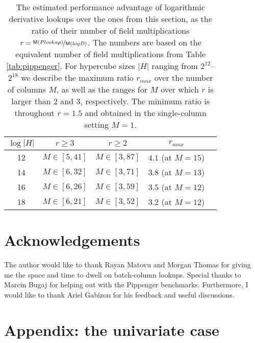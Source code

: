 \documentclass[11pt]{article}
\theoremstyle{definition}
\theoremstyle{definition}
\begin{document}
\begin{table}[h!]
\caption{%
The estimated performance advantage of logarithmic derivative lookups over the ones from this section, as the ratio of their number of field multiplications $r =\nicefrac{\mathsf M({Plookup})}{\mathsf M({logD})}$.
The numbers are based on the equivalent number of field multiplications from Table \ref{tab:pippenger}.
For hypercube sizes $|H|$ ranging from $2^{12}$--$2^{18}$ we describe the maximum ratio $r_{max}$ over the number of columns $M$, as well as the ranges for $M$ over which $r$ is larger than $2$ and $3$, respectively.
The minimum ratio is throughout $r= 1.5$ and obtained in the single-column setting $M=1$. 
}
\label{tab:comparison}
\vspace*{0.5cm}
\centering
\begin{tabular} {|c|c|c|c|c|}
\hline
$\log|H|$ & $r\geq 3$ & $r\geq 2$ & $r_{max}$ 
\\\hline
12 & $M\in [5, 41]$ & $M\in [3, 87]$ & $4.1$ (at $M =15$)
\\
14 & $M\in [6, 32]$ & $M\in [3, 71]$ & $3.8$ (at $M= 13$)
\\
16 & $M\in [6, 26]$  & $M\in [3, 59]$ & $3.5$ (at $M= 12$)
\\
18 & $M\in [6, 21]$  & $M\in [3, 52]$ & $3.2$ (at $M= 12$)
\\\hline
\end{tabular}
\end{table}

\section{Acknowledgements}

The author would like to thank Rayan Matovu and Morgan Thomas for giving me the space and time to dwell on batch-column lookups. 
Special thanks to Marcin Bugaj for helping out with the Pippenger benchmarks.
Furthermore, I would like to thank Ariel Gabizon for his feedback and useful discussions.






\appendix
\section{Appendix: the univariate case}
\label{s:appendix}
\end{document}
